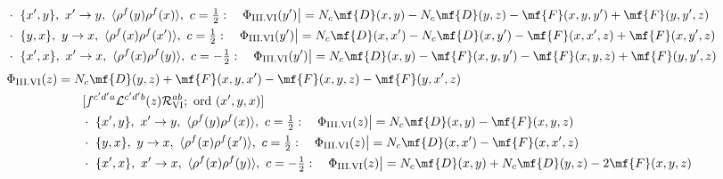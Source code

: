 {\begin{align}
&\qquad\cdot\ \{x',y\},\ x'\to y,\ \langle\rho^{f}(y)\rho^{f}(x)\rangle,\ c=\tfrac{1}{2}:\quad \Phi_{\rm III.VI}(y')\big|=N_{c}\mf{D}(x,y)-N_{c}\mf{D}(y,z)-\mf{F}(x,y,y')+\mf{F}(y,y',z)\notag\\
&\qquad\cdot\ \{y,x\},\ y\to x,\ \langle\rho^{f}(x)\rho^{f}(x')\rangle,\ c=\tfrac{1}{2}:\quad \Phi_{\rm III.VI}(y')\big|=N_{c}\mf{D}(x,x')-N_{c}\mf{D}(x,y')-\mf{F}(x,x',z)+\mf{F}(x,y',z)\notag\\
&\qquad\cdot\ \{x',x\},\ x'\to x,\ \langle\rho^{f}(x)\rho^{f}(y)\rangle,\ c=-\tfrac{1}{2}:\quad \Phi_{\rm III.VI}(y')\big|=N_{c}\mf{D}(x,y)-\mf{F}(x,y,y')-\mf{F}(x,y,z)+\mf{F}(y,y',z)\notag
\end{align}
\begin{align}
\Phi_{\rm III.VI}(z)&=N_{c}\mf{D}(y,z)+\mf{F}(x,y,x')-\mf{F}(x,y,z)-\mf{F}(y,x',z)\notag\\&\qquad[f^{c'd'a}\mathcal{L}^{c'd'b}(z)\mathcal{R}_{\rm VI}^{ab};\ \text{ord}\ (x',y,x)]\notag\\
&\qquad\cdot\ \{x',y\},\ x'\to y,\ \langle\rho^{f}(y)\rho^{f}(x)\rangle,\ c=\tfrac{1}{2}:\quad \Phi_{\rm III.VI}(z)\big|=N_{c}\mf{D}(x,y)-\mf{F}(x,y,z)\notag\\
&\qquad\cdot\ \{y,x\},\ y\to x,\ \langle\rho^{f}(x)\rho^{f}(x')\rangle,\ c=\tfrac{1}{2}:\quad \Phi_{\rm III.VI}(z)\big|=N_{c}\mf{D}(x,x')-\mf{F}(x,x',z)\notag\\
&\qquad\cdot\ \{x',x\},\ x'\to x,\ \langle\rho^{f}(x)\rho^{f}(y)\rangle,\ c=-\tfrac{1}{2}:\quad \Phi_{\rm III.VI}(z)\big|=N_{c}\mf{D}(x,y)+N_{c}\mf{D}(y,z)-2\mf{F}(x,y,z)\notag
\end{align}

}
